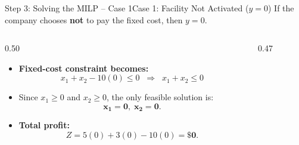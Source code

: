 \documentclass[aspectratio=169]{beamer}
\begin{document}
\begin{frame}{Step 3: Solving the MILP -- Case 1}{Case 1: Facility Not Activated ($y=0$)}
    If the company chooses \textbf{not} to pay the fixed cost, then $y=0$.

    \begin{columns}[T]
        \begin{column}{0.50\textwidth}
            \begin{itemize}
                \item \textbf{Fixed-cost constraint becomes:}
                \[
                  x_1 + x_2 - 10(0) \le 0 \;\;\Longrightarrow\;\; x_1 + x_2 \le 0
                \]
                \item Since $x_1 \ge 0$ and $x_2 \ge 0$, the only feasible solution is:
                \[
                  \mathbf{x_1 = 0,\; x_2 = 0}.
                \]
                \item \textbf{Total profit:}
                \[
                  Z = 5(0) + 3(0) - 10(0) = \mathbf{\$0}.
                \]
            \end{itemize}
        \end{column}
        \begin{column}{0.47\textwidth}
            \centering
        \end{column}
    \end{columns}
\end{frame}
\end{document}
